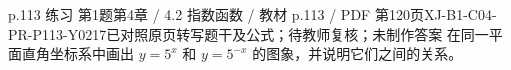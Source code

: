\par\noindent\begin{minipage}{\linewidth}
\begin{bankitem}{p.113 练习 第1题}{第4章 / 4.2 指数函数 / 教材 p.113 / PDF 第120页}{XJ-B1-C04-PR-P113-Y0217}{已对照原页转写题干及公式；待教师复核；未制作答案}
在同一平面直角坐标系中画出 $y=5^x$ 和 $y=5^{-x}$ 的图象，并说明它们之间的关系。
\end{bankitem}
\end{minipage}\par\medskip
